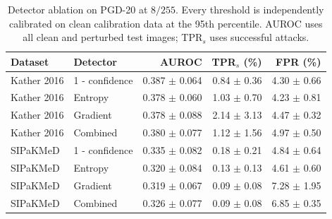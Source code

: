 \begin{table}[t]
\centering
\caption{Detector ablation on PGD-20 at $8/255$. Every threshold is independently calibrated on clean calibration data at the 95th percentile. AUROC uses all clean and perturbed test images; TPR$_s$ uses successful attacks.}
\label{tab:detectors}
\small
\setlength{\tabcolsep}{4pt}
\begin{tabular}{llrrr}
\toprule
Dataset & Detector & AUROC & TPR$_s$ (\%) & FPR (\%) \\
\midrule
Kather 2016 & 1 - confidence & 0.387 $\pm$ 0.064 & 0.84 $\pm$ 0.36 & 4.30 $\pm$ 0.66 \\
Kather 2016 & Entropy & 0.378 $\pm$ 0.060 & 1.03 $\pm$ 0.70 & 4.23 $\pm$ 0.81 \\
Kather 2016 & Gradient & 0.378 $\pm$ 0.088 & 2.14 $\pm$ 3.13 & 4.47 $\pm$ 0.32 \\
Kather 2016 & Combined & 0.380 $\pm$ 0.077 & 1.12 $\pm$ 1.56 & 4.97 $\pm$ 0.50 \\
SIPaKMeD & 1 - confidence & 0.335 $\pm$ 0.082 & 0.18 $\pm$ 0.21 & 4.84 $\pm$ 0.64 \\
SIPaKMeD & Entropy & 0.320 $\pm$ 0.084 & 0.13 $\pm$ 0.13 & 4.61 $\pm$ 0.60 \\
SIPaKMeD & Gradient & 0.319 $\pm$ 0.067 & 0.09 $\pm$ 0.08 & 7.28 $\pm$ 1.95 \\
SIPaKMeD & Combined & 0.326 $\pm$ 0.077 & 0.09 $\pm$ 0.08 & 6.85 $\pm$ 0.35 \\
\bottomrule
\end{tabular}
\end{table}
